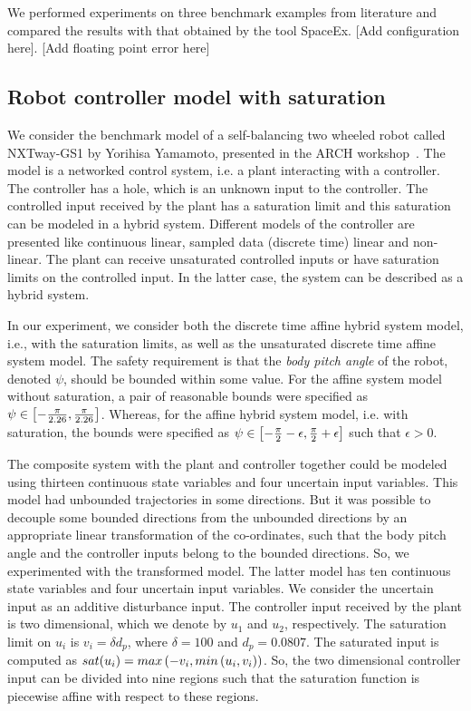 We performed experiments on three benchmark examples from literature
and compared the results with that obtained by the tool SpaceEx. [Add
  configuration here]. [Add floating point error here]

\subsection{Robot controller model with saturation}   We consider the benchmark
model of a self-balancing two wheeled robot called NXTway-GS1 by
Yorihisa Yamamoto, presented in the ARCH workshop~\cite{TODO}.  The
model is a networked control system, i.e. a plant interacting with a
controller.  The controller has a hole, which is an unknown input to
the controller.  The controlled input received by the plant has a
saturation limit and this saturation can be modeled in a hybrid
system.  Different models of the controller are presented like
continuous linear, sampled data (discrete time) linear and non-linear.
The plant can receive unsaturated controlled inputs or have saturation
limits on the controlled input.  In the latter case, the system can be
described as a hybrid system.

In our experiment, we consider both the discrete time affine hybrid
system model, i.e., with the saturation limits, as well as the
unsaturated discrete time affine system model.  The safety requirement
is that the \emph{body pitch angle} of the robot, denoted $\psi$,
should be bounded within some value.  For the affine system model
without saturation, a pair of reasonable bounds were specified as
$\psi\in\left[-\frac{\pi}{2.26},\frac{\pi}{2.26}\right]$.  Whereas, for the
affine hybrid system model, i.e. with saturation, the bounds were
specified as
$\psi\in\left[-\frac{\pi}{2}-\epsilon,\frac{\pi}{2}+\epsilon\right]$ such
that $\epsilon>0$.

The composite system with the plant and controller together could be
modeled using thirteen continuous state variables and four uncertain
input variables.  This model had unbounded trajectories in some
directions.  But it was possible to decouple some bounded directions
from the unbounded directions by an appropriate linear transformation
of the co-ordinates, such that the body pitch angle and the controller
inputs belong to the bounded directions.  So, we experimented with the
transformed model.  The latter model has ten continuous state
variables and four uncertain input variables.  We consider the
uncertain input as an additive disturbance input.  The controller
input received by the plant is two dimensional, which we denote by
$u_1$ and $u_2$, respectively.  The saturation limit on $u_i$ is
$v_i=\delta d_p$, where $\delta=100$ and $d_p=0.0807$.  The saturated
input is computed as $sat(u_i) = max\left(-v_i,min\left(u_i,v_i\right)\right)$.
So, the two dimensional controller input can be divided into nine
regions such that the saturation function is piecewise affine with
respect to these regions.

